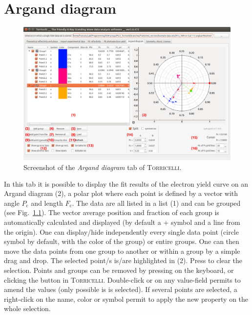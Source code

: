 \documentclass[oldfontcommands,openany,oneside]{memoir}
\begin{document}
\chapter{Argand diagram} \label{chap:Argand}
\begin{figure}[!b]
    \centering
    \includegraphics[width=1.2\textwidth]{img/Screenshot_Argand.pdf}
    \caption{Screenshot of the \emph{Argand diagram} tab of \textsc{Torricelli}.}
    \label{fig:Argand}
  \end{figure}
In this tab it is possible to display the fit results of the electron yield curve on an Argand diagram (2), a polar plot where each point is defined by a vector with angle $P_\mathrm{c}$ and length $F_\mathrm{c}$. The data are all listed in a list (1) and can be grouped (see Fig.~\ref{fig:Argand}). The vector average position and fraction of each group is automatically calculated and displayed (by default a + symbol and a line from the origin). One can display/hide independently every single data point (circle symbol by default, with the color of the group) or entire groups.  One can then move the data points from one group to another or within a group by a simple drag and drop. The selected point/s is/are highlighted in (2). Press  to clear the selection. Points and groups can be removed by pressing  on the keyboard, or clicking the  button in \textsc{Torricelli}. Double-click or  on any value-field permits to amend the values (only possible is  is selected). If several points are selected, a right-click on the name, color or symbol permit to apply the new property on the whole selection.
\end{document}
